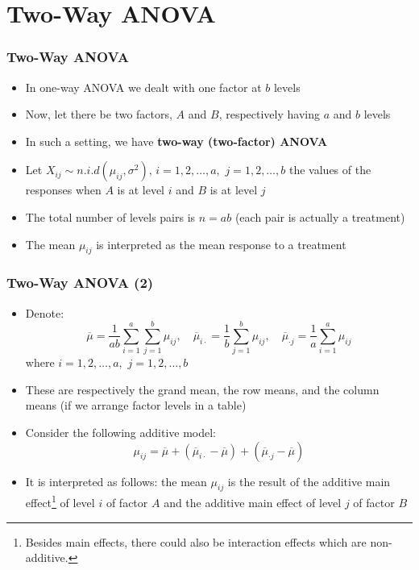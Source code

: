 \documentclass[10pt]{beamer}
\theoremstyle{definition}
\begin{document}
\section{Two-Way ANOVA}
\begin{frame}[fragile]
\frametitle{Two-Way ANOVA}
\begin{itemize}
	\item In one-way ANOVA we dealt with one factor at $b$ levels
	\item Now, let there be two factors, $A$ and $B$, respectively having $a$ and $b$ levels
	\item In such a setting, we have \textbf{two-way (two-factor) ANOVA}
	\item Let $X_{ij}\sim n.i.d (\mu_{ij},\sigma^{2}),\, i = 1, 2, \ldots, a,\,\, j = 1, 2, \ldots, b$ the values of the responses when $A$ is at level $i$ and $B$ is at level $j$
	\item The total number of levels pairs is $n = ab$ (each pair is actually a treatment)
	\item The mean $\mu_{ij}$ is interpreted as the mean response to a treatment 
\end{itemize}
\end{frame}

\begin{frame}[fragile]
\frametitle{Two-Way ANOVA (2)}
\begin{itemize}
	\item Denote:
	\[
		\overline{\mu} = \frac{1}{ab}\sum_{i=1}^{a}\sum_{j=1}^{b}\mu_{ij},\quad \overline{\mu}_{i\cdot} = \frac{1}{b}\sum_{j=1}^{b}\mu_{ij},\quad \overline{\mu}_{\cdot j} = \frac{1}{a}\sum_{i=1}^{a}\mu_{ij}
	\]
	where  $i = 1, 2, \ldots, a,\,\, j = 1, 2, \ldots, b$
	\item These are respectively the grand mean, the row means, and the column means (if we arrange factor levels in a table)
	\item Consider the following additive model:
	\[
		\mu_{ij} = \overline{\mu} + (\overline{\mu}_{i\cdot} - \overline{\mu}) + (\overline{\mu}_{\cdot j} - \overline{\mu})
	\]
	\item It is interpreted as follows: the mean $\mu_{ij}$ is the result of the additive main effect\footnote{Besides main effects, there could also be interaction effects which are non-additive.} of level $i$ of factor $A$ and the additive main effect of level $j$ of factor $B$
\end{itemize}
\end{frame}
\end{document}
